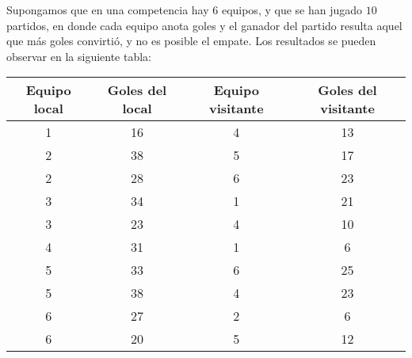 \begin{ejemplo}
	\normalfont
	Supongamos que en una competencia hay $6$ equipos, y que se han jugado $10$ partidos, en donde cada equipo anota goles y el ganador del partido resulta aquel que más goles convirtió, y no es posible el empate. Los resultados se pueden observar en la siguiente tabla:

	\begin{table}[h]
		\centering
		\begin{tabular}{|c|c|c|c|}
			\hline
			\textbf{Equipo local} & \textbf{Goles del local} & \textbf{Equipo visitante} & \textbf{Goles del visitante} \\ \hline
			1                     & 16                       & 4                         & 13                           \\ \hline
			2                     & 38                       & 5                         & 17                           \\ \hline
			2                     & 28                       & 6                         & 23                           \\ \hline
			3                     & 34                       & 1                         & 21                           \\ \hline
			3                     & 23                       & 4                         & 10                           \\ \hline
			4                     & 31                       & 1                         & 6                            \\ \hline
			5                     & 33                       & 6                         & 25                           \\ \hline
			5                     & 38                       & 4                         & 23                           \\ \hline
			6                     & 27                       & 2                         & 6                            \\ \hline
			6                     & 20                       & 5                         & 12                           \\ \hline
		\end{tabular}
	\end{table}
	
	
\end{ejemplo}
 